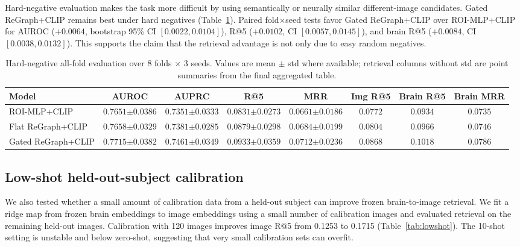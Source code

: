 \documentclass{article}
\begin{document}
Hard-negative evaluation makes the task more difficult by using semantically or neurally similar different-image candidates. Gated ReGraph+CLIP remains best under hard negatives (Table~\ref{tab:hardneg}). Paired fold$\times$seed tests favor Gated ReGraph+CLIP over ROI-MLP+CLIP for AUROC ($+0.0064$, bootstrap 95\% CI $[0.0022,0.0104]$), R@5 ($+0.0102$, CI $[0.0057,0.0145]$), and brain R@5 ($+0.0084$, CI $[0.0038,0.0132]$). This supports the claim that the retrieval advantage is not only due to easy random negatives.

\begin{table}[!htbp]
  \centering
  \caption{Hard-negative all-fold evaluation over 8 folds $\times$ 3 seeds. Values are mean $\pm$ std where available; retrieval columns without std are point summaries from the final aggregated table.}
  \label{tab:hardneg}
  \scriptsize
  \setlength{\tabcolsep}{3.5pt}
  \renewcommand{\arraystretch}{1.15}
  \begin{tabular}{lccccccc}
    \toprule
    Model & AUROC & AUPRC & R@5 & MRR & Img R@5 & Brain R@5 & Brain MRR \\
    \midrule
    ROI-MLP+CLIP & $0.7651{\scriptstyle\pm0.0386}$ & $0.7351{\scriptstyle\pm0.0333}$ & $0.0831{\scriptstyle\pm0.0273}$ & $0.0661{\scriptstyle\pm0.0186}$ & $0.0772$ & $0.0934$ & $0.0735$ \\
    Flat ReGraph+CLIP & $0.7658{\scriptstyle\pm0.0329}$ & $0.7381{\scriptstyle\pm0.0285}$ & $0.0879{\scriptstyle\pm0.0298}$ & $0.0684{\scriptstyle\pm0.0199}$ & $0.0804$ & $0.0966$ & $0.0746$ \\
    Gated ReGraph+CLIP & $\mathbf{0.7715{\scriptstyle\pm0.0382}}$ & $\mathbf{0.7461{\scriptstyle\pm0.0349}}$ & $\mathbf{0.0933{\scriptstyle\pm0.0359}}$ & $\mathbf{0.0712{\scriptstyle\pm0.0236}}$ & $\mathbf{0.0868}$ & $\mathbf{0.1018}$ & $\mathbf{0.0786}$ \\
    \bottomrule
  \end{tabular}
\end{table}

\subsection{Low-shot held-out-subject calibration}

We also tested whether a small amount of calibration data from a held-out subject can improve frozen brain-to-image retrieval. We fit a ridge map from frozen brain embeddings to image embeddings using a small number of calibration images and evaluated retrieval on the remaining held-out images. Calibration with 120 images improves image R@5 from 0.1253 to 0.1715 (Table~\ref{tab:lowshot}). The 10-shot setting is unstable and below zero-shot, suggesting that very small calibration sets can overfit.
\end{document}
